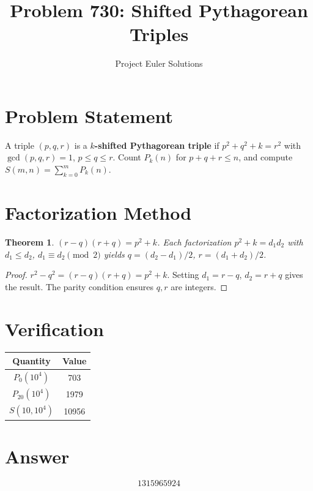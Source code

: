 \documentclass[11pt]{article}
\title{Problem 730: Shifted Pythagorean Triples}
\author{Project Euler Solutions}
\date{}
\newtheorem{theorem}{Theorem}
\begin{document}
\maketitle

\section{Problem Statement}
A triple $(p,q,r)$ is a \textbf{$k$-shifted Pythagorean triple} if $p^2+q^2+k=r^2$ with $\gcd(p,q,r)=1$, $p \le q \le r$. Count $P_k(n)$ for $p+q+r \le n$, and compute $S(m,n) = \sum_{k=0}^{m} P_k(n)$.

\section{Factorization Method}

\begin{theorem}
$(r-q)(r+q) = p^2+k$. Each factorization $p^2+k = d_1 d_2$ with $d_1 \le d_2$, $d_1 \equiv d_2 \pmod{2}$ yields $q = (d_2-d_1)/2$, $r = (d_1+d_2)/2$.
\end{theorem}

\begin{proof}
$r^2 - q^2 = (r-q)(r+q) = p^2+k$. Setting $d_1 = r-q$, $d_2 = r+q$ gives the result. The parity condition ensures $q,r$ are integers.
\end{proof}

\section{Verification}
\begin{center}
\begin{tabular}{cc}
\toprule
Quantity & Value \\
\midrule
$P_0(10^4)$ & 703 \\
$P_{20}(10^4)$ & 1979 \\
$S(10, 10^4)$ & 10956 \\
\bottomrule
\end{tabular}
\end{center}

\section{Answer}

\[
\boxed{1315965924}
\]
\end{document}
